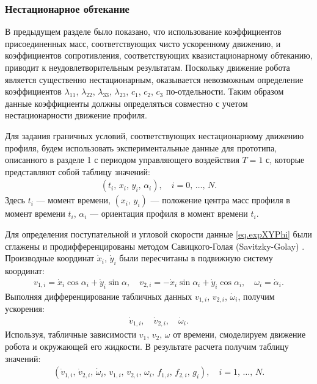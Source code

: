 \subsubsection*{Нестационарное обтекание}\label{ssec.unsteady}


В предыдущем разделе было показано, что использование коэффициентов присоединенных масс, соответствующих чисто ускоренному движению, и коэффициентов сопротивления, соответствующих квазистационарному обтеканию, приводит к неудовлетворительным результатам. Поскольку движение робота является существенно нестационарным, оказывается невозможным определение коэффициентов $\lambda_{11}$, $\lambda_{22}$, $\lambda_{33}$, $\lambda_{23}$, $c_1$, $c_2$, $c_3$ по-отдельности. Таким образом данные коэффициенты должны определяться совместно с учетом нестационарности движение профиля.

Для задания граничных условий, соответствующих нестационарному движению профиля, будем использовать экспериментальные данные для прототипа, описанного в разделе 1 с периодом управляющего воздействия $T = 1$ с, которые представляют собой таблицу значений:
\begin{gather}
	(t_i,\, x_i,\, y_i,\, \alpha_i),\quad i = 0,\, \ldots,\, N.\label{eq.expXYPhi}
\end{gather}
Здесь $t_i$ --- момент времени, $(x_i,\, y_i)$ --- положение центра масс профиля в момент времени $t_i$, $\alpha_i$ --- ориентация профиля в момент времени $t_i$.

Для определения поступательной и угловой скорости данные \eqref{eq.expXYPhi} были сглажены и продифференцированы методом Савицкого-Голая (Savitzky-Golay) \cite{Gorry_1990, Savitzky_Golay_1964}. Производные координат $\dot{x}_i$, $\dot{y}_i$ были пересчитаны в подвижную систему координат:
\begin{gather}
	v_{1,i} = \dot{x}_i \cos\alpha_i + \dot{y}_i \sin \alpha,\quad v_{2,i} = -\dot{x}_i \sin\alpha_i + \dot{y}_i \cos\alpha_i,\quad \omega_i = \dot{\alpha}_i.
\end{gather}
Выполняя дифференцирование табличных данных $v_{1,i}$, $v_{2,i}$, $\dot{\omega}_i$, получим ускорения:
\begin{gather}
	\dot{v}_{1,i},\quad \dot{v}_{2,i},\quad \dot{\omega}_i.
\end{gather}
Используя, табличные зависимости $v_1$, $v_2$, $\omega$ от времени, смоделируем движение робота и окружающей его жидкости. В результате расчета получим таблицу значений:
\begin{gather}
	(\dot{v}_{1,i},\, \dot{v}_{2,i},\, \dot{\omega}_i,\, v_{1,i},\, v_{2,i},\, \omega_i,\, f_{1,i},\, f_{2,i},\, g_i),\quad i = 1,\, \ldots,\, N.
\end{gather}

